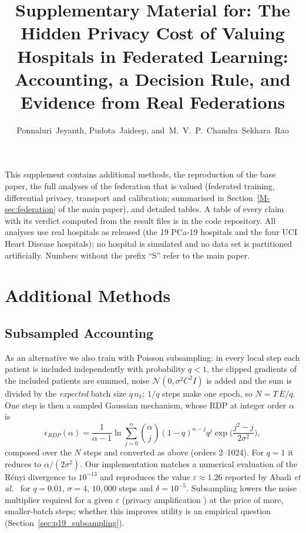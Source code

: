\documentclass[journal]{IEEEtran}
\begin{document}
\title{Supplementary Material for: The Hidden Privacy Cost of Valuing Hospitals in Federated Learning: Accounting, a Decision Rule, and Evidence from Real Federations}
\author{Ponnaluri~Jeyanth, Pudota~Jaideep, and~M.~V.~P.~Chandra~Sekhara~Rao}
\markboth{}{}
\maketitle

This supplement contains additional methods, the reproduction of the base paper, the full analyses of the federation that is valued (federated training, differential privacy, transport and calibration; summarised in Section~\ref{M-sec:federation} of the main paper), and detailed tables. A table of every claim with its verdict computed from the result files is in the code repository. All analyses use real hospitals as released (the 19 PCa-19 hospitals and the four UCI Heart Disease hospitals); no hospital is simulated and no data set is partitioned artificially. Numbers without the prefix ``S'' refer to the main paper.

\section{Additional Methods}
\label{sec:methods_more}
\subsection{Subsampled Accounting}
As an alternative we also train with Poisson subsampling: in every local step each patient is included independently with probability $q<1$, the clipped gradients of the included patients are summed, noise $\mathcal{N}(0,\sigma^2C^2I)$ is added and the sum is divided by the \emph{expected} batch size $q\,n_k$; $1/q$ steps make one epoch, so $N = T\,E/q$. One step is then a sampled Gaussian mechanism, whose RDP at integer order $\alpha$ is \cite{Mironov2019SampledGaussian, Zhu2019Poisson, Wang2019SubsampledRDP}
\begin{equation}
\epsilon_{RDP}(\alpha) = \frac{1}{\alpha-1}\ln \sum_{j=0}^{\alpha} \binom{\alpha}{j} (1-q)^{\alpha-j} q^{j} \exp\!\Big(\frac{j^2-j}{2\sigma^2}\Big),
\end{equation}
composed over the $N$ steps and converted as above (orders 2--1024). For $q=1$ it reduces to $\alpha/(2\sigma^2)$. Our implementation matches a numerical evaluation of the Rényi divergence to $10^{-13}$ and reproduces the value $\varepsilon \approx 1.26$ reported by Abadi \emph{et al.}\ \cite{Abadi2016DPSGD} for $q=0.01$, $\sigma=4$, $10{,}000$ steps and $\delta=10^{-5}$. Subsampling lowers the noise multiplier required for a given $\varepsilon$ (privacy amplification \cite{Balle2018Amplification}) at the price of more, smaller-batch steps; whether this improves utility is an empirical question (Section~\ref{sec:p19_subsampling}).
\end{document}
